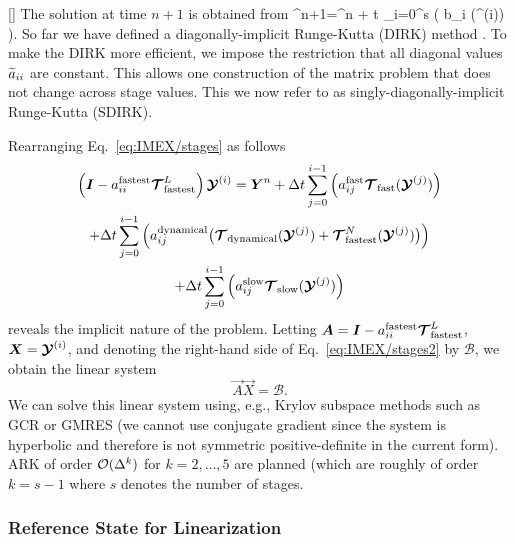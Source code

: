 \documentclass{article}
\begin{document}
{[]
The solution at time $n+1$ is obtained from
\be
\qvector^{n+1}=\qvector^n + \Delta t \sum_{i=0}^{s} \left( b_i (\qstage^{(i)}) \right).
\label{eq:IMEX/update}
\ee
So far we have defined a diagonally-implicit Runge-Kutta (DIRK) method \citep{alexander:1977,butcher:1981a,ascher:1997,boscarino:2009}.  To make the DIRK more efficient, we impose the restriction that all diagonal values $\widetilde{a}_{ii}$ are constant. This allows one construction of the matrix problem that does not change across stage values.  This we now refer to as singly-diagonally-implicit Runge-Kutta (SDIRK).

Rearranging Eq.\ \eqref{eq:IMEX/stages} as follows
\begin{multline}\label{eq:IMEX/stages2}
\left( \boldsymbol{{I}} - {a}^{\mathrm{fastest}}_{ii}\boldsymbol{{\mathcal{T}}}^L_{\mathrm{fastest}} \right)  \boldsymbol{{\mathcal{Y}}}^{(i)}  =  \boldsymbol{{Y}}^n + 
\Delta t \sum_{j=0}^{i-1} \left( {a}^{\mathrm{fast}}_{ij} \boldsymbol{{\mathcal{T}}}_{\mathrm{fast}}(\boldsymbol{{\mathcal{Y}}}^{(j)}) \right)   \\
+ \Delta t \sum_{j=0}^{i-1} \left( {a}^{\mathrm{dynamical}}_{ij} \bigl(\boldsymbol{{\mathcal{T}}}_{\mathrm{dynamical}}(\boldsymbol{{\mathcal{Y}}}^{(j)}) + \boldsymbol{{\mathcal{T}}}^N_\mathrm{fastest}(\boldsymbol{{\mathcal{Y}}}^{(j)})\bigr) \right) \\
+ \Delta t \sum_{j=0}^{i-1} \left( {a}^{\mathrm{slow}}_{ij} \boldsymbol{{\mathcal{T}}}_{\mathrm{slow}}(\boldsymbol{{\mathcal{Y}}}^{(j)}) \right) 
\end{multline}
reveals the implicit nature of the problem. Letting $\boldsymbol{{A}}=\boldsymbol{{I}} - {a}^{\mathrm{fastest}}_{ii} \boldsymbol{{\mathcal{T}}}^L_{\mathrm{fastest}}$, $\boldsymbol{{X}}=\boldsymbol{{\mathcal{Y}}}^{(i)}$, and denoting the right-hand side of Eq.~\eqref{eq:IMEX/stages2} by $\mathcal{B}$, we obtain the linear system 
\[
\vec{A} \vec{X} = \mathcal{B}.
\]
We can solve this linear system using, e.g., Krylov subspace methods such as GCR or GMRES (we cannot use conjugate gradient since the system is hyperbolic and therefore is not symmetric positive-definite in the current form). ARK of order $\mathcal{O}(\Delta ^k)$ for $k=2,\ldots,5$ are planned (which are roughly of order $k=s-1$ where $s$ denotes the number of stages.

\subsubsection{Reference State for Linearization}

}
\end{document}

